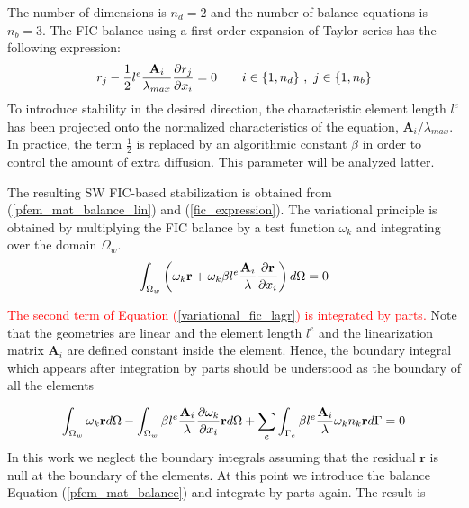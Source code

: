 The number of dimensions is $n_d=2$ and the number of balance equations is $n_b=3$. The FIC-balance using a first order expansion of Taylor series has the following expression:
\begin{equation} \label{fic_expression}
    r_j - \frac{1}{2} l^e \frac{\mathbf{A}_i}{\lambda_{max}} \frac{\partial r_j}{\partial x_i} = 0 \qquad i \in \{1,n_d\} \ , \ j \in \{1,n_b\}
\end{equation}
To introduce stability in the desired direction, the characteristic element length $l^e$ has been projected onto the normalized characteristics of the equation, $\mathbf{A}_i/\lambda_{max}$.
In practice, the term $\frac{1}{2}$ is replaced by an algorithmic constant $\beta$ in order to control the amount of extra diffusion. This parameter will be analyzed latter.


The resulting SW FIC-based stabilization is obtained from (\ref{pfem_mat_balance_lin}) and (\ref{fic_expression}). The variational principle is obtained by multiplying the FIC balance by a test function $\omega_k$ and integrating over the domain $\Omega_w$.
\begin{equation} \label{variational_fic_lagr}
    \int_{\Omega_w} \left(\omega_k \mathbf{r} + \omega_k \beta l^e \frac{\mathbf{A}_i}{\lambda} \frac{\partial\mathbf{r}}{\partial x_i}\right) d\Omega = 0
\end{equation}


\textcolor{red}{The second term of Equation (\ref{variational_fic_lagr}) is integrated by parts.} Note that the geometries are linear and the element length $l^e$ and the linearization matrix $\mathbf{A}_i$ are defined constant inside the element. Hence, the boundary integral which appears after integration by parts should be understood as the boundary of all the elements

\begin{equation} \label{variational_fic_lagr_parts}
\int_{\Omega_w} \omega_k \mathbf{r} d\Omega
- \int_{\Omega_w} \beta l^e\frac{\mathbf{A}_i}{\lambda}\frac{\partial\omega_k}{\partial x_i} \mathbf{r} d\Omega
+ \sum_e \int_{\Gamma_e} \beta l^e\frac{\mathbf{A}_i}{\lambda}\omega_kn_k \mathbf{r} d\Gamma = 0
\end{equation}
In this work we neglect the boundary integrals assuming that the residual $\mathbf{r}$ is null at the boundary of the elements. At this point we introduce the balance Equation (\ref{pfem_mat_balance}) and integrate by parts again. The result is

